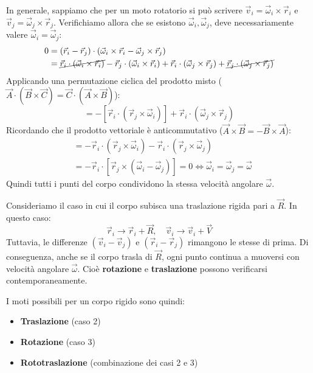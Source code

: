 In generale, sappiamo che per un moto rotatorio si può scrivere $\vec{v}_i = \vec{\omega}_i \times \vec{r}_i$ e $\vec{v}_j = \vec{\omega}_j \times \vec{r}_j$. Verifichiamo allora che se esistono $\vec{\omega}_i, \vec{\omega}_j$, deve necessariamente valere $\vec{\omega}_i = \vec{\omega}_j$:
\begin{align*}
    0 &= (\vec{r}_i - \vec{r}_j) \cdot (\vec{\omega}_i \times \vec{r}_i - \vec{\omega}_j \times \vec{r}_j) \\
    &= \cancel{\vec{r}_i \cdot (\vec{\omega}_i \times \vec{r}_i)} - \vec{r}_j \cdot (\vec{\omega}_i \times \vec{r}_i) + \vec{r}_i \cdot (\vec{\omega}_j \times \vec{r}_j) + \cancel{\vec{r}_j \cdot (\vec{\omega}_j \times \vec{r}_j)}
\end{align*}
Applicando una permutazione ciclica del prodotto misto ($\vec{A} \cdot (\vec{B} \times \vec{C}) = \vec{C} \cdot (\vec{A} \times \vec{B})$):
\begin{equation}
    = - \left[ \vec{r}_i \cdot (\vec{r}_j \times \vec{\omega}_i) \right] + \vec{r}_i \cdot (\vec{\omega}_j \times \vec{r}_j)
\end{equation}
Ricordando che il prodotto vettoriale è anticommutativo ($\vec{A} \times \vec{B} = -\vec{B} \times \vec{A}$):
\begin{align*}
    &= - \vec{r}_i \cdot (\vec{r}_j \times \vec{\omega}_i) - \vec{r}_i \cdot (\vec{r}_j \times \vec{\omega}_j) \\
    &= - \vec{r}_i \cdot \left[ \vec{r}_j \times (\vec{\omega}_i - \vec{\omega}_j) \right] = 0 \iff \vec{\omega}_i = \vec{\omega}_j = \vec{\omega}
\end{align*}
Quindi tutti i punti del corpo condividono la stessa velocità angolare $\vec{\omega}$.

Consideriamo il caso in cui il corpo subisca una traslazione rigida pari a $\vec{R}$. In questo caso:
\begin{equation*}
    \vec{r}_i \to \vec{r}_i + \vec{R}, \quad \vec{v}_i \to \vec{v}_i + \vec{V}
\end{equation*}
Tuttavia, le differenze $(\vec{v}_i - \vec{v}_j)$ e $(\vec{r}_i - \vec{r}_j)$ rimangono le stesse di prima. Di conseguenza, anche se il corpo trasla di $\vec{R}$, ogni punto continua a muoversi con velocità angolare $\vec{\omega}$.
Cioè \textbf{rotazione} e \textbf{traslazione} possono verificarsi contemporaneamente.

I moti possibili per un corpo rigido sono quindi:
\begin{itemize}
    \item \textbf{Traslazione} (caso 2)
    \item \textbf{Rotazione} (caso 3)
    \item \textbf{Rototraslazione} (combinazione dei casi 2 e 3)
\end{itemize}

